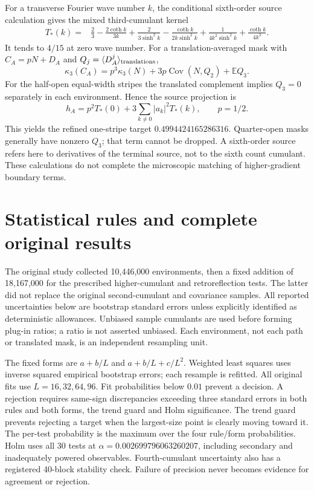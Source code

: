 \documentclass[10pt,a4paper]{article}
\newcommand{\E}{\mathbb E}
\newcommand{\Cov}{\operatorname{Cov}}
\begin{document}
For a transverse Fourier wave number \(k\), the conditional sixth-order
source calculation gives the mixed third-cumulant kernel
\begin{align}
T_*(k)={}&\frac23-\frac{2\coth k}{3k}
+\frac{2}{3\sinh^2k}
-\frac{\coth k}{2k\sinh^2k}
+\frac{1}{4k^2\sinh^2k}+\frac{\coth k}{4k^3}.
\end{align}
It tends to \(4/15\) at zero wave number. For a translation-averaged mask
with \(C_A=pN+D_A\) and \(Q_j=\langle D_A^j\rangle_{\rm translations}\),
\[
\kappa_3(C_A)=p^3\kappa_3(N)+3p\Cov(N,Q_2)+\E Q_3 .
\]
For the half-open equal-width stripes the translated complement implies
\(Q_3=0\) separately in each environment. Hence the source projection is
\[
h_A=p^2T_*(0)+3\sum_{k\ne0}|a_k|^2T_*(k),\qquad p=1/2.
\]
This yields the refined one-stripe target \(0.4994424165286316\).
Quarter-open masks generally have nonzero \(Q_3\); that term cannot be
dropped. A sixth-order source refers here to derivatives of the terminal
source, not to the sixth count cumulant. These calculations do not complete
the microscopic matching of higher-gradient boundary terms.

\section{Statistical rules and complete original results}
The original study collected 10,446,000 environments, then a fixed addition
of 18,167,000 for the prescribed higher-cumulant and retroreflection tests.
The latter did not replace the original second-cumulant and covariance
samples. All reported uncertainties below are bootstrap standard errors
unless explicitly identified as deterministic allowances.
Unbiased sample cumulants are used before forming plug-in ratios; a ratio
is not asserted unbiased. Each environment, not each path or translated
mask, is an independent resampling unit.

The fixed forms are \(a+b/L\) and \(a+b/L+c/L^2\). Weighted least squares
uses inverse squared empirical bootstrap errors; each resample is refitted.
All original fits use \(L=16,32,64,96\). Fit probabilities below \(0.01\)
prevent a decision. A rejection requires same-sign discrepancies exceeding
three standard errors in both rules and both forms, the trend guard and
Holm significance. The trend guard prevents rejecting a target when
the largest-size point is clearly moving toward it.
The per-test probability is the maximum over the four rule/form
probabilities. Holm uses all 30 tests at
\(\alpha=0.002699796063260207\), including secondary and inadequately
powered observables. Fourth-cumulant uncertainty also has a registered
40-block stability check. Failure of precision never becomes evidence for
agreement or rejection.
\end{document}
